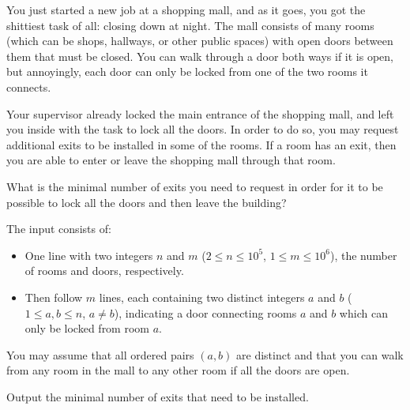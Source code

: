 

\newcommand{\maxn}{10^5}
\newcommand{\maxm}{10^6}

You just started a new job at a shopping mall, and as it goes, you got the
shittiest task of all: closing down at night.
The mall consists of many rooms (which can be shops, hallways, or other public spaces)
with open doors between them that must be closed.
You can walk through a door both ways if it is open, but annoyingly, each door
can only be locked from one of the two rooms it connects.

Your supervisor already locked the main entrance of the shopping mall,
and left you inside with the task to lock all the doors.
In order to do so, you may request additional exits to be installed in some of the rooms.
If a room has an exit, then you are able to enter or leave the shopping mall through that room.

What is the minimal number of exits you need to request in order for it to be possible to lock all the doors and then leave the building?


\begin{Input}
    The input consists of:
    \begin{itemize}
        \item One line with two integers $n$ and $m$ ($2\leq n \leq \maxn$, $1\leq m \leq \maxm$), the number of rooms and doors, respectively.
        \item Then follow $m$ lines, each containing two distinct integers $a$ and $b$ ($1 \leq a,b \leq n$, $a \neq b$),
            indicating a door connecting rooms $a$ and $b$ which can only be locked from room
            $a$.
    \end{itemize}
    You may assume that all ordered pairs $(a,b)$ are distinct and that you can
    walk from any room in the mall to any other room if all the doors are open.
\end{Input}

\begin{Output}
    Output the minimal number of exits that need to be installed.
\end{Output}
